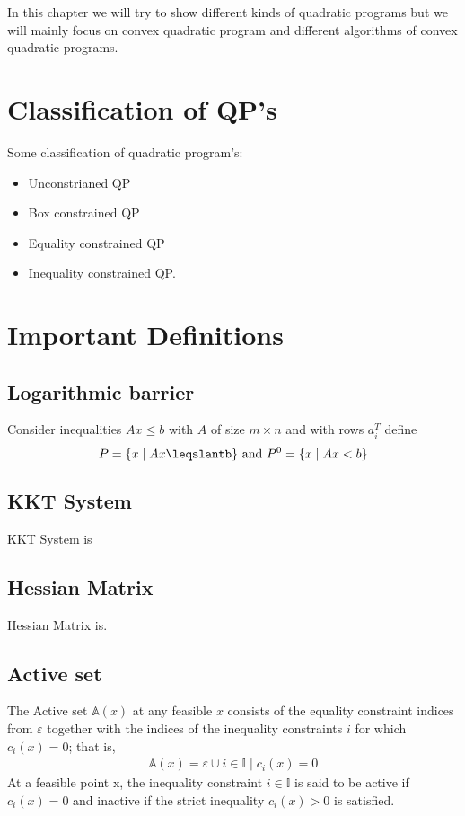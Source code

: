 In this chapter we will try to show different kinds of quadratic programs but we will mainly focus on convex quadratic program and different algorithms of convex quadratic programs.

\section{Classification of QP's}

Some classification of quadratic program's:
\begin{itemize}
	\item Unconstrianed QP
	\item Box constrained QP
	\item Equality constrained QP
	\item Inequality constrained QP.
\end{itemize}

\section*{Important Definitions}
\subsection*{Logarithmic barrier}
Consider inequalities $Ax \leqslant b$ with $A$ of size $m\times n$ and with rows $a_i^T$
define
\begin{equation*}
P=\lbrace x \mid Ax \leqslantb \rbrace \text{ and } P^0=\lbrace x \mid Ax < b \rbrace
\end{equation*}

\subsection*{KKT System}
KKT System is
\subsection*{Hessian Matrix}
Hessian Matrix is.
\subsection*{Active set}
The Active set $\mathbb{A}(x)$ at any feasible $x$ consists of the equality constraint indices from $\varepsilon$ together with the indices of the inequality constraints $i$ for which $c_i(x)=0$; that is,
\begin{equation*}
	\begin{aligned}
		\mathbb{A}(x)=\varepsilon \cup {i\in \mathbb{I}\mid c_i(x)=0}
	\end{aligned}
\end{equation*}
At a feasible point x, the inequality constraint $i\in \mathbb{I}$ is said to be active if $c_i(x)=0$ and inactive if the strict inequality $c_i(x)>0$ is satisfied.

